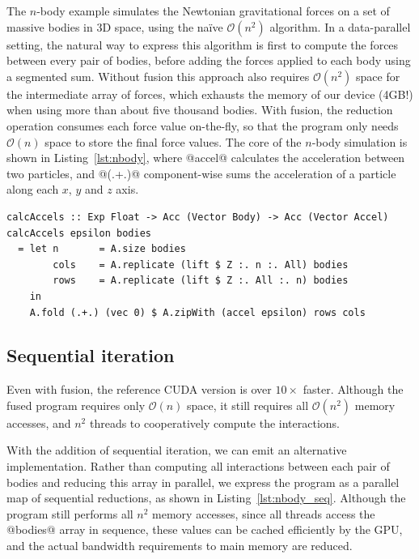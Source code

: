 The $n$-body example simulates the Newtonian gravitational forces on a set of
massive bodies in 3D space, using the na\"ive $\mathcal{O}\left( n^{2} \right)$
algorithm. In a data-parallel setting, the natural way to express this algorithm
is first to compute the forces between every pair of bodies, before adding the
forces applied to each body using a segmented sum. Without fusion this approach
also requires $\mathcal{O}\left( n^{2} \right)$ space for the intermediate array
of forces, which exhausts the memory of our device (4GB!) when using more than
about five thousand bodies. With fusion, the reduction operation consumes each
force value on-the-fly, so that the program only needs $\mathcal{O}\left( n
\right)$ space to store the final force values. The core of the $n$-body
simulation is shown in Listing~\ref{lst:nbody}, where @accel@ calculates
the acceleration between two particles, and @(.+.)@ component-wise sums the
acceleration of a particle along each $x$, $y$ and $z$ axis.

\begin{lstlisting}[style=haskell_float
    ,label=lst:nbody
    ,caption={$N$-body gravitational simulation, using parallel reduction}]
calcAccels :: Exp Float -> Acc (Vector Body) -> Acc (Vector Accel)
calcAccels epsilon bodies
  = let n       = A.size bodies
        cols    = A.replicate (lift $ Z :. n :. All) bodies
        rows    = A.replicate (lift $ Z :. All :. n) bodies
    in
    A.fold (.+.) (vec 0) $ A.zipWith (accel epsilon) rows cols
\end{lstlisting}


\subsection{Sequential iteration}

Even with fusion, the reference CUDA version is over $10\times$ faster. Although
the fused program requires only $\mathcal{O}\left( n \right)$ space, it still
requires all $\mathcal{O}\left( n^2 \right)$ memory accesses, and $n^{2}$
threads to cooperatively compute the interactions.

With the addition of sequential iteration, we can emit an alternative
implementation. Rather than computing all interactions between each pair of
bodies and reducing this array in parallel, we express the program as a parallel
map of sequential reductions, as shown in Listing~\ref{lst:nbody_seq}. Although
the program still performs all $n^{2}$ memory accesses, since all threads access
the @bodies@ array in sequence, these values can be cached efficiently by the
GPU, and the actual bandwidth requirements to main memory are reduced.

